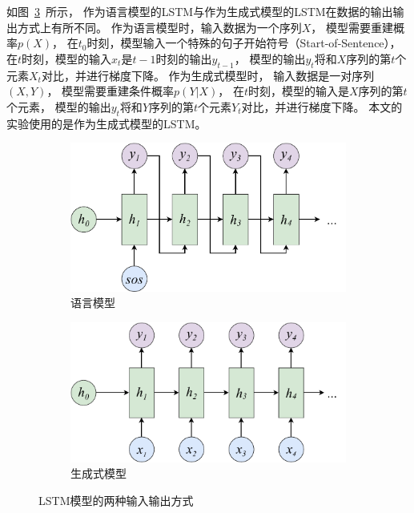如图~\ref{fig:LSTM_IO}~所示，
作为语言模型的LSTM与作为生成式模型的LSTM在数据的输出输出方式上有所不同。
作为语言模型时，输入数据为一个序列$X$，
模型需要重建概率$p(X)$，
在$t_0$时刻，模型输入一个特殊的句子开始符号（Start-of-Sentence），
在$t$时刻，模型的输入$x_t$是$t-1$时刻的输出$y_{t-1}$，
模型的输出$y_t$将和$X$序列的第$t$个元素$X_t$对比，并进行梯度下降。
作为生成式模型时，
输入数据是一对序列$(X, Y)$，
模型需要重建条件概率$p(Y|X)$，
在$t$时刻，模型的输入是$X$序列的第$t$个元素，
模型的输出$y_t$将和$Y$序列的第$t$个元素$Y_t$对比，并进行梯度下降。
本文的实验使用的是作为生成式模型的LSTM。
\begin{figure}[H]
    \begin{subfigure}{0.4\linewidth}
        \includegraphics[width=\linewidth]{figure/drawio/RNNLM_lm_v2.pdf}
        \centering
        \caption{语言模型}
        \label{fig:RNNLM_}
    \end{subfigure}%
    \begin{subfigure}{0.4\linewidth}
        \includegraphics[width=\linewidth]{figure/drawio/RNNLM_generative_v1.pdf}
        \centering
        \caption{生成式模型}
        \label{fig:RNNLM_generative_v1}
    \end{subfigure}
    \centering
    \caption{LSTM模型的两种输入输出方式}
    \label{fig:LSTM_IO}
\end{figure}

